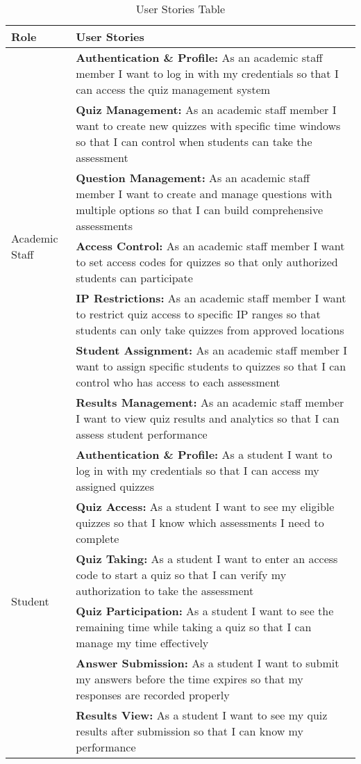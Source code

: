 \begin{table}
\centering
\begin{tabular}{|p{3cm}|p{11cm}|}
\hline
\textbf{Role} & \textbf{User Stories} \\
\hline
\multirow{7}{*}{Academic Staff} & \textbf{Authentication \& Profile:} As an academic staff member I want to log in with my credentials so that I can access the quiz management system \\
\cline{2-2}
& \textbf{Quiz Management:} As an academic staff member I want to create new quizzes with specific time windows so that I can control when students can take the assessment \\
\cline{2-2}
& \textbf{Question Management:} As an academic staff member I want to create and manage questions with multiple options so that I can build comprehensive assessments \\
\cline{2-2}
& \textbf{Access Control:} As an academic staff member I want to set access codes for quizzes so that only authorized students can participate \\
\cline{2-2}
& \textbf{IP Restrictions:} As an academic staff member I want to restrict quiz access to specific IP ranges so that students can only take quizzes from approved locations \\
\cline{2-2}
& \textbf{Student Assignment:} As an academic staff member I want to assign specific students to quizzes so that I can control who has access to each assessment \\
\cline{2-2}
& \textbf{Results Management:} As an academic staff member I want to view quiz results and analytics so that I can assess student performance \\
\hline
\multirow{7}{*}{Student} & \textbf{Authentication \& Profile:} As a student I want to log in with my credentials so that I can access my assigned quizzes \\
\cline{2-2}
& \textbf{Quiz Access:} As a student I want to see my eligible quizzes so that I know which assessments I need to complete \\
\cline{2-2}
& \textbf{Quiz Taking:} As a student I want to enter an access code to start a quiz so that I can verify my authorization to take the assessment \\
\cline{2-2}
& \textbf{Quiz Participation:} As a student I want to see the remaining time while taking a quiz so that I can manage my time effectively \\
\cline{2-2}
& \textbf{Answer Submission:} As a student I want to submit my answers before the time expires so that my responses are recorded properly \\
\cline{2-2}
& \textbf{Results View:} As a student I want to see my quiz results after submission so that I can know my performance \\
\hline
\end{tabular}
\caption{User Stories Table}
\label{tab:user-stories-table}
\end{table}



